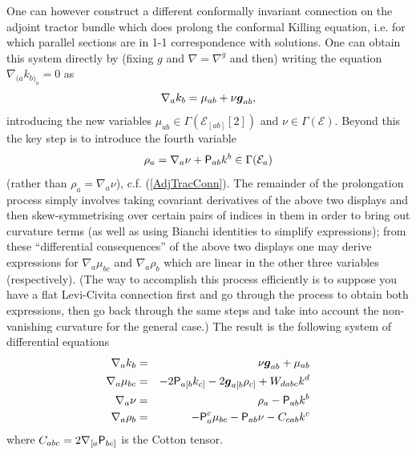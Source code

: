 \documentclass[a4paper,12pt]{amsart}
\def\Cal{\mathcal}
\newcommand{\V}{\mbox{\sf P}}
\newcommand{\ce}{{\Cal E}}
\def\bg{\mbox{\boldmath $g$}}
\theoremstyle{remark}
\newcommand{\nn}[1]{(\ref{#1})}
\begin{document}
One can however construct a different conformally invariant connection on the adjoint tractor bundle which does prolong the conformal Killing equation, i.e. for which parallel sections are in 1-1 correspondence with solutions. One can obtain this system directly by (fixing $g$ and $\nabla=\nabla^g$ and then) writing the equation $\nabla_{(a} k_{b)_o} =0$ as
$$
\nabla_a k_b = \mu_{ab} + \nu \bg_{ab},
$$
introducing the new variables $\mu_{ab}\in \Gamma(\ce_{[ab]}[2])$ and $\nu\in \Gamma(\ce)$. Beyond this the key step is to introduce the fourth variable 
$$
\rho_a = \nabla_a\nu +\V_{ab}k^b \in \Gamma(\ce_a)
$$
(rather than $\rho_a=\nabla_a \nu$), c.f. \nn{AdjTracConn}. The remainder of the prolongation process simply involves taking covariant derivatives of the above two displays and then skew-symmetrising over certain pairs of indices in them in order to bring out curvature terms (as well as using Bianchi identities to simplify expressions); from these ``differential consequences'' of the above two displays one may derive expressions for $\nabla_a\mu_{bc}$ and $\nabla_a\rho_{b}$ which are linear in the other three variables (respectively). (The way to accomplish this process efficiently is to suppose you have a flat Levi-Civita connection first and go through the process to obtain both expressions, then go back through the same steps and take into account the non-vanishing curvature for the general case.) The result is the following system of differential equations
\begin{eqnarray*}
\nabla_a k_b &=& \nu \bg_{ab} + \mu_{ab} \\
\nabla_a \mu_{bc} &=& - 2\V_{a[b}k_{c]} - 2\bg_{a[b}\rho_{c]} +W_{dabc}k^d \\
\nabla_a \nu &=& \rho_a - \V_{ab}k^b \\
\nabla_a \rho_b &=& -\V_a^c\mu_{bc} - \V_{ab}\nu - C_{cab}k^c
\end{eqnarray*}
where $C_{abc}=2\nabla_{[a}\V_{bc]}$ is the Cotton tensor.
\end{document}
